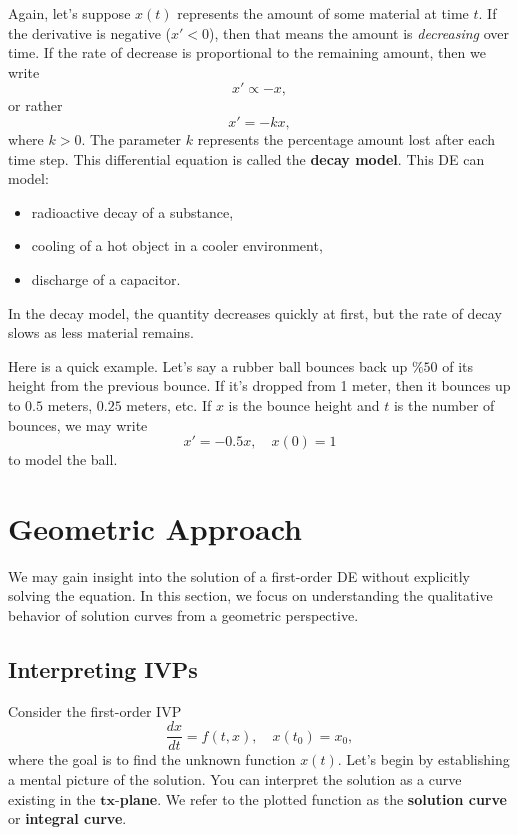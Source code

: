 \documentclass[09pt,letterpaper]{article}
\begin{document}
Again, let's suppose $x(t)$ represents the amount of some material at time $t$. If the derivative is negative ($x'<0$), then that means the amount is \textit{decreasing} over time. If the rate of decrease is proportional to the remaining amount, then we write
\[
x' \propto -x,
\]
or rather
\[
x' = -kx,
\]
where $k>0$. The parameter $k$ represents the percentage amount lost after each time step. This differential equation is called the \textbf{decay model}.  This DE can model:
\begin{itemize}
    \item radioactive decay of a substance,
    \item cooling of a hot object in a cooler environment,
    \item discharge of a capacitor.
\end{itemize}
In the decay model, the quantity decreases quickly at first, but the rate of decay slows as less material remains. 

Here is a quick example. Let's say a rubber ball bounces back up $\%50$ of its height from the previous bounce. If it's dropped from 1 meter, then it bounces up to $0.5$ meters, $0.25$ meters, etc. If $x$ is the bounce height and $t$ is the number of bounces, we may write
$$
x' = -0.5 x,\quad x(0)=1
$$
to model the ball.


\section{Geometric Approach}
We may gain insight into the solution of a first-order DE without explicitly solving the equation. In this section, we focus on understanding the qualitative behavior of solution curves from a geometric perspective.

\subsection{Interpreting IVPs}

Consider the first-order IVP
$$
\frac{dx}{dt} = f(t,x),\quad x(t_0)=x_0,
$$
where the goal is to find the unknown function $x(t)$. Let's begin by establishing a mental picture of the solution. You can interpret the solution as a curve existing in the $\mathbf{tx}$-\textbf{plane}. We refer to the plotted function as the \textbf{solution curve} or \textbf{integral curve}. 
\end{document}
